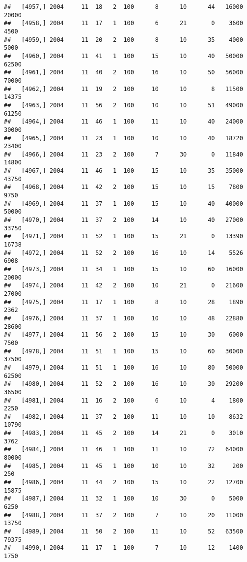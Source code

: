 \documentclass{article}\usepackage[]{graphicx}\usepackage[]{color}
\makeatletter
\newenvironment{kframe}{%
 \def\at@end@of@kframe{}%
 \ifinner\ifhmode%
  \def\at@end@of@kframe{\end{minipage}}%
  \begin{minipage}{\columnwidth}%
 \fi\fi%
 \def\FrameCommand##1{\hskip\@totalleftmargin \hskip-\fboxsep
 \colorbox{shadecolor}{##1}\hskip-\fboxsep
     \hskip-\linewidth \hskip-\@totalleftmargin \hskip\columnwidth}%
 \MakeFramed {\advance\hsize-\width
   \@totalleftmargin\z@ \linewidth\hsize
   \@setminipage}}%
 {\par\unskip\endMakeFramed%
 \at@end@of@kframe}
\newenvironment{knitrout}{}{} %
\makeatother
\begin{document}
\begin{knitrout}
\begin{kframe}
\begin{verbatim}
##   [4957,] 2004     11  18   2  100      8      10      44   16000   20000
##   [4958,] 2004     11  17   1  100      6      21       0    3600    4500
##   [4959,] 2004     11  20   2  100      8      10      35    4000    5000
##   [4960,] 2004     11  41   1  100     15      10      40   50000   62500
##   [4961,] 2004     11  40   2  100     16      10      50   56000   70000
##   [4962,] 2004     11  19   2  100     10      10       8   11500   14375
##   [4963,] 2004     11  56   2  100     10      10      51   49000   61250
##   [4964,] 2004     11  46   1  100     11      10      40   24000   30000
##   [4965,] 2004     11  23   1  100     10      10      40   18720   23400
##   [4966,] 2004     11  23   2  100      7      30       0   11840   14800
##   [4967,] 2004     11  46   1  100     15      10      35   35000   43750
##   [4968,] 2004     11  42   2  100     15      10      15    7800    9750
##   [4969,] 2004     11  37   1  100     15      10      40   40000   50000
##   [4970,] 2004     11  37   2  100     14      10      40   27000   33750
##   [4971,] 2004     11  52   1  100     15      21       0   13390   16738
##   [4972,] 2004     11  52   2  100     16      10      14    5526    6908
##   [4973,] 2004     11  34   1  100     15      10      60   16000   20000
##   [4974,] 2004     11  42   2  100     10      21       0   21600   27000
##   [4975,] 2004     11  17   1  100      8      10      28    1890    2362
##   [4976,] 2004     11  37   1  100     10      10      48   22880   28600
##   [4977,] 2004     11  56   2  100     15      10      30    6000    7500
##   [4978,] 2004     11  51   1  100     15      10      60   30000   37500
##   [4979,] 2004     11  51   1  100     16      10      80   50000   62500
##   [4980,] 2004     11  52   2  100     16      10      30   29200   36500
##   [4981,] 2004     11  16   2  100      6      10       4    1800    2250
##   [4982,] 2004     11  37   2  100     11      10      10    8632   10790
##   [4983,] 2004     11  45   2  100     14      21       0    3010    3762
##   [4984,] 2004     11  46   1  100     11      10      72   64000   80000
##   [4985,] 2004     11  45   1  100     10      10      32     200     250
##   [4986,] 2004     11  44   2  100     15      10      22   12700   15875
##   [4987,] 2004     11  32   1  100     10      30       0    5000    6250
##   [4988,] 2004     11  37   2  100      7      10      20   11000   13750
##   [4989,] 2004     11  50   2  100     11      10      52   63500   79375
##   [4990,] 2004     11  17   1  100      7      10      12    1400    1750

\end{verbatim}
\end{kframe}
\end{knitrout}
\end{document}
